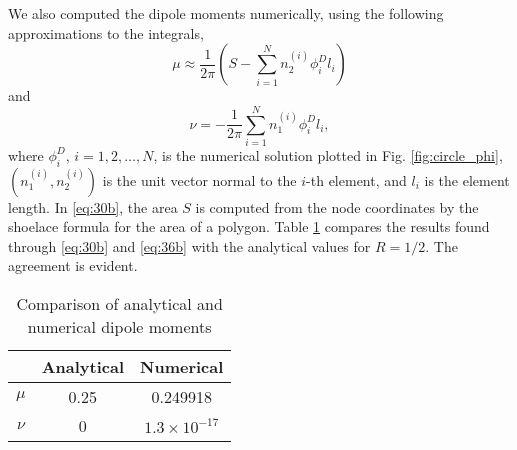 \documentclass[11pt]{article}
\begin{document}
We also computed the dipole moments numerically, using the following approximations to the integrals,
\begin{equation}
  \label{eq:30b}
  \mu \approx \frac{1}{2\pi}\left(S - \sum_{i=1}^N n_2^{(i)} \phi_i^D l_i\right)
\end{equation}
and
\begin{equation}
  \label{eq:36b}
  \nu =- \frac{1}{2\pi}\sum_{i=1}^N n_1^{(i)} \phi_i^D l_i,
\end{equation}
where
$\phi^D_i$, $i=1,2,\ldots,N$, is the numerical solution plotted in Fig. \ref{fig:circle_phi}, $\left(n_1^{(i)}, n_2^{(i)}\right)$ is the unit vector normal to the $i$-th element, and $l_i$ is the element length. In \eqref{eq:30b}, the area $S$ is computed from the node coordinates by the shoelace formula for the area of a polygon. Table \ref{tab:dipole} compares the results found through \eqref{eq:30b} and \eqref{eq:36b} with the analytical values for $R=1/2$. The agreement is evident.
\begin{table}[h]
  \centering
\begin{tabular}{c|c|c}
      & Analytical & Numerical \\ \hline
$\mu$ &     0.25   & 0.249918          \\ \hline
$\nu$ &     0      & $1.3 \times 10^{-17}$
\end{tabular}  \caption{Comparison of analytical and numerical dipole moments}
  \label{tab:dipole}
\end{table}
\clearpage



 
\end{document}
